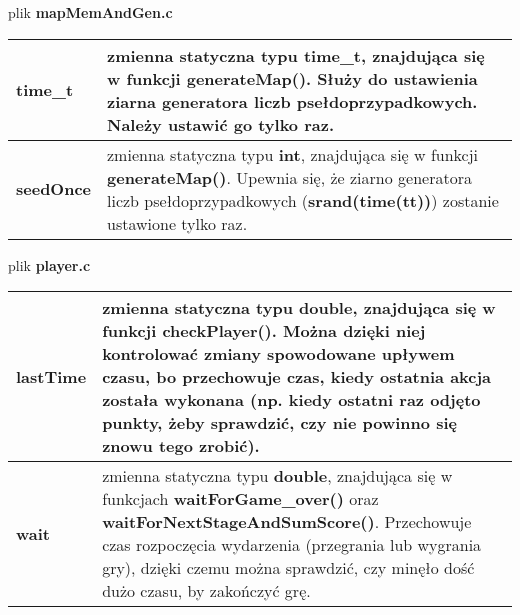 \documentclass[12pt,a4paper]{article}
\begin{document}
{\Large plik \textbf{mapMemAndGen.c}}
\begin{center}
\begin{tabularx}{\linewidth}{ |l|X| } 

\hline
\textbf{time\_t}&
zmienna statyczna typu \textbf{time\_t}, znajdująca się w funkcji \textbf{generateMap()}. Służy do ustawienia ziarna generatora liczb psełdoprzypadkowych. Należy ustawić go tylko raz.\\

\hline
\textbf{seedOnce}&
zmienna statyczna typu \textbf{int}, znajdująca się w funkcji \textbf{generateMap()}. Upewnia się, że ziarno generatora liczb psełdoprzypadkowych (\textbf{srand(time(tt))}) zostanie ustawione tylko raz.\\

\hline
\end{tabularx}
\end{center}

\newpage
{\Large plik \textbf{player.c}}
\begin{center}
\begin{tabularx}{\linewidth}{ |l|X| } 

\hline
\textbf{lastTime}&
zmienna statyczna typu \textbf{double}, znajdująca się w funkcji \textbf{checkPlayer()}. Można dzięki niej kontrolować zmiany spowodowane upływem czasu, bo przechowuje czas, kiedy ostatnia akcja została wykonana (np. kiedy ostatni raz odjęto punkty, żeby sprawdzić, czy nie powinno się znowu tego zrobić).\\

\hline
\textbf{wait}&
zmienna statyczna typu \textbf{double}, znajdująca się w funkcjach \textbf{waitForGame\_over()} oraz \textbf{waitForNextStageAndSumScore()}. Przechowuje czas rozpoczęcia wydarzenia (przegrania lub wygrania gry), dzięki czemu można sprawdzić, czy minęło dość dużo czasu, by zakończyć grę.\\

\hline
\end{tabularx}
\end{center}

\end{document}
